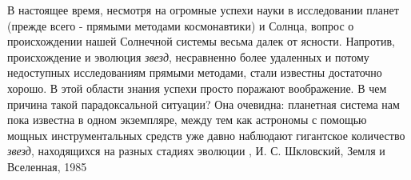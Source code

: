 В настоящее время, несмотря на огромные успехи науки в исследовании планет
(прежде всего - прямыми методами космонавтики) и Солнца, вопрос о происхождении
нашей Солнечной системы весьма далек от ясности. Напротив, происхождение и
эволюция \emph{звезд}, несравненно более удаленных и потому недоступных
исследованиям прямыми методами, стали известны достаточно хорошо. В этой
области знания успехи просто поражают воображение. В чем причина такой
парадоксальной ситуации? Она очевидна: планетная система нам пока известна в
одном экземпляре, между тем как астрономы с помощью мощных инструментальных
средств уже давно наблюдают гигантское количество \emph{звезд}, находящихся на
разных стадиях эволюции
, И. С. Шкловский, Земля и Вселенная, 1985


